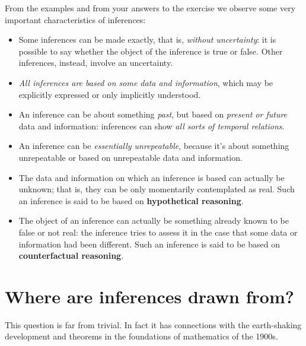 \documentclass[
  a4paper,
  DIV=11,
  numbers=noendperiod,
  oneside]{scrreprt}
\begin{document}
From the examples and from your answers to the exercise we observe some
very important characteristics of inferences:

\begin{itemize}
\item
  Some inferences can be made exactly, that is, {\emph{without
  uncertainty}}: it is possible to say whether the object of the
  inference is true or false. Other inferences, instead, involve an
  uncertainty.
\item
  {\emph{All inferences are based on some data and information}}, which
  may be explicitly expressed or only implicitly understood.
\item
  An inference can be about something \emph{past}, but based on
  \emph{present or future} data and information: inferences can show
  {\emph{all sorts of temporal relations}}.
\item
  An inference can be {\emph{essentially unrepeatable}}, because it's
  about something unrepeatable or based on unrepeatable data and
  information.
\item
  The data and information on which an inference is based can actually
  be unknown; that is, they can be only momentarily contemplated as
  real. Such an inference is said to be based on {\textbf{hypothetical
  reasoning}}.
\item
  The object of an inference can actually be something already known to
  be false or not real: the inference tries to assess it in the case
  that some data or information had been different. Such an inference is
  said to be based on {\textbf{counterfactual reasoning}}.
\end{itemize}

\hypertarget{where-are-inferences-drawn-from}{%
\section{Where are inferences drawn
from?}\label{where-are-inferences-drawn-from}}

This question is far from trivial. In fact it has connections with the
earth-shaking development and theorems in the foundations of mathematics
of the 1900s.

\end{document}
